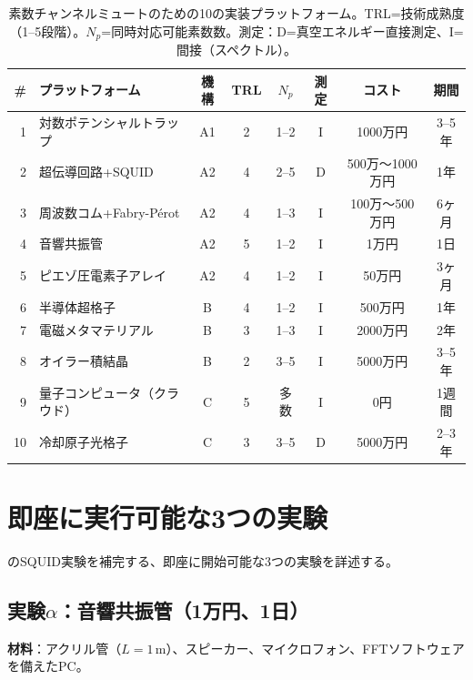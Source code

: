 \documentclass[11pt,a4paper]{article}
\begin{document}
\begin{table}[t]
\centering
\caption{素数チャンネルミュートのための10の実装プラットフォーム。TRL=技術成熟度（1--5段階）。$N_p$=同時対応可能素数数。測定：D=真空エネルギー直接測定、I=間接（スペクトル）。}
\label{tab:comparison}
\small
\begin{tabular}{@{}rlcccccc@{}}
\toprule
\# & プラットフォーム & 機構 & TRL & $N_p$ & 測定 & コスト & 期間 \\
\midrule
1 & 対数ポテンシャルトラップ & A1 & 2 & 1--2 & I & 1000万円 & 3--5年 \\
2 & 超伝導回路+SQUID~\cite{paper_A} & A2 & 4 & 2--5 & D & 500万〜1000万円 & 1年 \\
3 & 周波数コム+Fabry-P\'{e}rot & A2 & 4 & 1--3 & I & 100万〜500万円 & 6ヶ月 \\
4 & 音響共振管 & A2 & 5 & 1--2 & I & 1万円 & 1日 \\
5 & ピエゾ圧電素子アレイ & A2 & 4 & 1--2 & I & 50万円 & 3ヶ月 \\
6 & 半導体超格子 & B & 4 & 1--2 & I & 500万円 & 1年 \\
7 & 電磁メタマテリアル & B & 3 & 1--3 & I & 2000万円 & 2年 \\
8 & オイラー積結晶 & B & 2 & 3--5 & I & 5000万円 & 3--5年 \\
9 & 量子コンピュータ（クラウド） & C & 5 & 多数 & I & 0円 & 1週間 \\
10 & 冷却原子光格子 & C & 3 & 3--5 & D & 5000万円 & 2--3年 \\
\bottomrule
\end{tabular}
\end{table}

\section{即座に実行可能な3つの実験}
\label{sec:immediate}

\cite{paper_A}のSQUID実験を補完する、即座に開始可能な3つの実験を詳述する。

\subsection{実験$\alpha$：音響共振管（1万円、1日）}

\textbf{材料}：アクリル管（$L = 1$\,m）、スピーカー、マイクロフォン、FFTソフトウェアを備えたPC。
\end{document}

